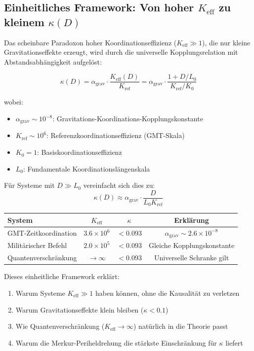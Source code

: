 \documentclass[11pt,a4paper]{article}
\begin{document}
	\subsection{Einheitliches Framework: Von hoher $K_{\mathrm{eff}}$ zu kleinem $\kappa(D)$}
	
	Das scheinbare Paradoxon hoher Koordinationseffizienz ($K_{\mathrm{eff}} \gg 1$), 
	die nur kleine Gravitationseffekte erzeugt, wird durch die universelle Kopplungsrelation 
	mit Abstandsabhängigkeit aufgelöst:
	
	\begin{equation}
		\boxed{\kappa(D) = \alpha_{\text{grav}} \cdot \frac{K_{\mathrm{eff}}(D)}{K_{\text{ref}}} 
			= \alpha_{\text{grav}} \cdot \frac{1 + D/L_0}{K_{\text{ref}}/K_0}}
	\end{equation}
	
	wobei:
	\begin{itemize}
		\item $\alpha_{\text{grav}} \sim 10^{-8}$: Gravitations-Koordinations-Kopplungskonstante
		\item $K_{\text{ref}} \sim 10^6$: Referenzkoordinationseffizienz (GMT-Skala)
		\item $K_0 = 1$: Basiskoordinationseffizienz
		\item $L_0$: Fundamentale Koordinationslängenskala
	\end{itemize}
	
	Für Systeme mit $D \gg L_0$ vereinfacht sich dies zu:
	\begin{equation}
		\kappa(D) \approx \alpha_{\text{grav}} \cdot \frac{D}{L_0 K_{\text{ref}}}
	\end{equation}
	
	\begin{table}[htbp]
		\centering
		\begin{tabular}{lccc}
			\toprule
			\textbf{System} & \textbf{$K_{\mathrm{eff}}$} & \textbf{$\kappa$} & \textbf{Erklärung} \\
			\midrule
			GMT-Zeitkoordination & $3.6\times10^6$ & $<0.093$ & $\alpha_{\text{grav}} \sim 2.6\times10^{-8}$ \\
			Militärischer Befehl & $2.0\times10^5$ & $<0.093$ & Gleiche Kopplungskonstante \\
			Quantenverschränkung & $\to\infty$ & $<0.093$ & Universelle Schranke gilt \\
			\bottomrule
		\end{tabular}
	\end{table}
	
	Dieses einheitliche Framework erklärt:
	\begin{enumerate}
		\item Warum Systeme $K_{\mathrm{eff}} \gg 1$ haben können, ohne die Kausalität zu verletzen
		\item Warum Gravitationseffekte klein bleiben ($\kappa < 0.1$)
		\item Wie Quantenverschränkung ($K_{\mathrm{eff}} \to\infty$) natürlich in die Theorie passt
		\item Warum die Merkur-Periheldrehung die stärkste Einschränkung für $\kappa$ liefert
	\end{enumerate}
	
\end{document}

